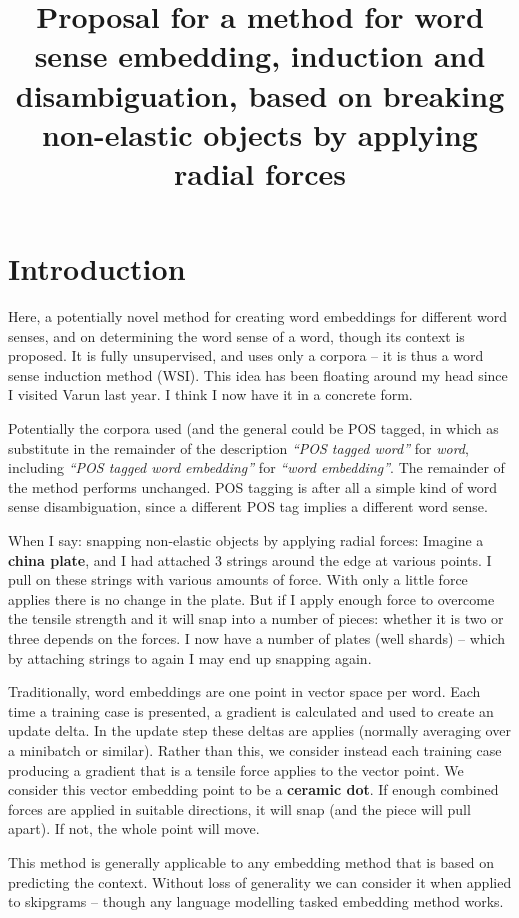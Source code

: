 \documentclass{article}
\title{Proposal for a method for word sense embedding, induction and disambiguation, based on breaking non-elastic objects by applying radial forces}
\begin{document}
\maketitle

\section{Introduction}

Here, a potentially novel method for creating word embeddings for different word senses, and on determining the word sense of a word, though its context is proposed. It is fully unsupervised, and uses only a corpora -- it is thus a word sense induction method (WSI).
This idea has been floating around my head since I visited Varun last year. I think I now have it in a concrete form.

Potentially the corpora used (and the general could be POS tagged, in which as substitute in the remainder of the description \emph{``POS tagged word''} for \emph{word}, including \emph{``POS tagged word embedding''} for \emph{``word embedding''}. The remainder of the method performs unchanged. POS tagging is after all a simple kind of word sense disambiguation, since a different POS tag implies a different word sense.

When I say: snapping non-elastic objects by applying radial forces:
Imagine a \textbf{china plate}, and I had attached 3 strings around the edge at various points. I pull on these strings with various amounts of force. With only a little force applies there is no change in the plate. But if I apply enough force to overcome the tensile strength and it will snap into a number of pieces: whether it is two or three depends on the forces. I now have a number of plates (well shards) -- which by attaching strings to again I may end up snapping again.

Traditionally, word embeddings are one point in vector space per word. Each time a training case is presented, a gradient is calculated and used to create an update delta. In the update step these deltas are applies (normally averaging over a minibatch or similar).
Rather than this, we consider instead each training case producing a gradient that is a tensile force applies to the vector point. We consider this vector embedding point to be a \textbf{ceramic dot}. If enough combined forces are applied in suitable directions, it will snap (and the piece will pull apart). If not, the whole point will move. 

This method is generally applicable to any embedding method that is based on predicting the context. Without loss of generality we can consider it when applied to skipgrams -- though any language modelling tasked embedding method works.
\end{document}
